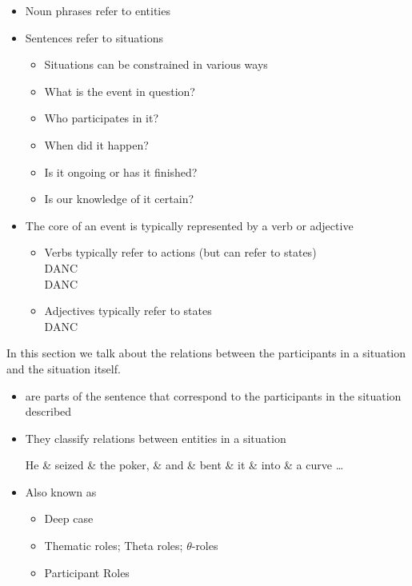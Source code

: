 \documentclass[a4paper,landscape,headrule,footrule,xetex]{foils}
\begin{document}
\begin{itemize}
\item Noun phrases refer to entities
\item Sentences refer to situations
  \begin{itemize}
  \item Situations can be constrained in various ways
  \item What is the event in question?
  \item Who participates in it?
  \item When did it happen?
  \item Is it ongoing or has it finished?
  \item Is our knowledge of it certain?
  \end{itemize}
\item The core of an event is typically represented by a verb or
  adjective 
  \begin{itemize}
  \item Verbs typically refer to actions (but can refer to states)
    \\  DANC
    \\   DANC
  \item Adjectives typically refer to states
    \\  DANC
  \end{itemize}
\end{itemize}

In this section we talk about the relations between the participants
in a situation and the situation itself.

\begin{itemize}
\item  {} are parts of the sentence that 
correspond to the participants in the situation 
described

\item  They classify relations between entities in a situation
\\[2ex] \begin{dependency}
\begin{deptext}[column sep=1em]
He \& seized \& the poker, \& and \& bent \& it \& into \& a curve \ldots \\ %
\end{deptext}
\end{dependency}
 \newpage
\item  Also known as
\begin{itemize}
\item  Deep case \citep{Fillmore:1968}
\item  Thematic roles; Theta roles;   $\theta$-roles
\item  Participant Roles
\end{itemize}
\end{itemize}
 
\end{document}

